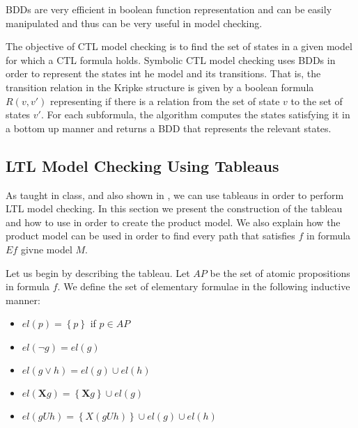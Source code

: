 \documentclass[11pt]{article}
\begin{document}
        BDDs are very efficient in boolean function representation and can be
        easily manipulated and thus can be very useful in model checking.

        The objective of CTL model checking is to find the set of states in a
        given model for which a CTL formula holds. Symbolic CTL model checking
        uses BDDs in order to represent the states int he model and its transitions.
        That is, the transition relation in the Kripke structure is given by
        a boolean formula $R(v,v')$ representing if there is a relation from the
        set of state $v$ to the set of states $v'$. For each subformula, the 
        algorithm computes the states satisfying it in a bottom up manner and returns
        a BDD that represents the relevant states.


    \subsection{LTL Model Checking Using Tableaus}
        As taught in class, and also shown in \cite{ltl}, we can use tableaus in
        order to perform LTL model checking. In this section we present the
        construction of the tableau and how to use in order to create the product
        model. We also explain how the product model can be used in order to 
        find every path that satisfies $f$ in formula $Ef$ givne model $M$.

        Let us begin by describing the tableau. Let $AP$ be the set of atomic
        propositions in formula $f$. We define the set of elementary formulae
        in the following inductive manner:
        \begin{itemize}
            \item 
                $el(p) = \left\{p\right\}$ if $p\in AP$

            \item
                $el(\neg g) = el(g)$

            \item 
                $el(g\vee h) = el(g) \cup el(h)$

            \item 
                $el(\mathbf{X}g) = \left\{\mathbf{X}g\right\} \cup el(g)$

            \item 
                $el(gUh) = \left\{X(gUh)\right\} \cup el(g) \cup el(h)$
        \end{itemize}
\end{document}
